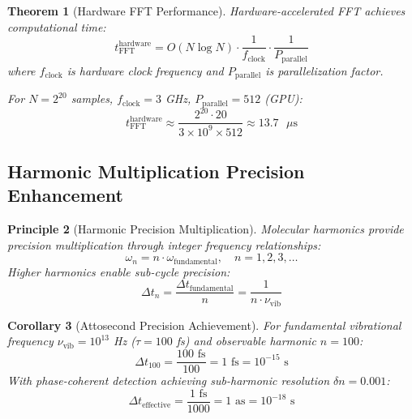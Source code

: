 \documentclass[12pt,a4paper]{article}
\newtheorem{theorem}{Theorem}[section]
\newtheorem{corollary}[theorem]{Corollary}
\newtheorem{principle}[theorem]{Principle}
\begin{document}
\begin{theorem}[Hardware FFT Performance]
Hardware-accelerated FFT achieves computational time:
\begin{equation}
t_{\text{FFT}}^{\text{hardware}} = O(N \log N) \cdot \frac{1}{f_{\text{clock}}} \cdot \frac{1}{P_{\text{parallel}}}
\end{equation}
where $f_{\text{clock}}$ is hardware clock frequency and $P_{\text{parallel}}$ is parallelization factor.

For $N = 2^{20}$ samples, $f_{\text{clock}} = 3$ GHz, $P_{\text{parallel}} = 512$ (GPU):
\begin{equation}
t_{\text{FFT}}^{\text{hardware}} \approx \frac{2^{20} \cdot 20}{3 \times 10^9 \times 512} \approx 13.7 \text{ $\mu$s}
\end{equation}
\end{theorem}

\subsection{Harmonic Multiplication Precision Enhancement}

\begin{principle}[Harmonic Precision Multiplication]
Molecular harmonics provide precision multiplication through integer frequency relationships:
\begin{equation}
\omega_n = n \cdot \omega_{\text{fundamental}}, \quad n = 1, 2, 3, \ldots
\end{equation}
Higher harmonics enable sub-cycle precision:
\begin{equation}
\Delta t_n = \frac{\Delta t_{\text{fundamental}}}{n} = \frac{1}{n \cdot \nu_{\text{vib}}}
\end{equation}
\end{principle}

\begin{corollary}[Attosecond Precision Achievement]
For fundamental vibrational frequency $\nu_{\text{vib}} = 10^{13}$ Hz ($\tau = 100$ fs) and observable harmonic $n = 100$:
\begin{equation}
\Delta t_{100} = \frac{100 \text{ fs}}{100} = 1 \text{ fs} = 10^{-15} \text{ s}
\end{equation}
With phase-coherent detection achieving sub-harmonic resolution $\delta n = 0.001$:
\begin{equation}
\Delta t_{\text{effective}} = \frac{1 \text{ fs}}{1000} = 1 \text{ as} = 10^{-18} \text{ s}
\end{equation}
\end{corollary}
\end{document}

